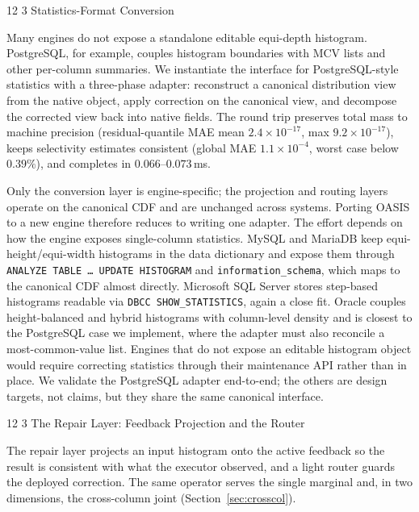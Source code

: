 \documentclass[preprint,12pt]{elsarticle}
\makeatletter
\renewcommand\subsection{\@startsection{subsection}{2}{\z@}%
           {12\p@ \@plus 6\p@ \@minus 3\p@}%
           {3\p@ \@plus 6\p@ \@minus 3\p@}%
           {\normalfont\normalsize\bfseries}}
\makeatother
\begin{document}
\subsection{Statistics-Format Conversion}
\label{sec:mcv-adapter}

Many engines do not expose a standalone editable equi-depth histogram. PostgreSQL,
for example, couples histogram boundaries with MCV lists and other per-column
summaries. We instantiate the interface for PostgreSQL-style statistics with a
three-phase adapter: reconstruct a canonical distribution view from the native
object, apply correction on the canonical view, and decompose the corrected view
back into native fields. The round trip preserves total mass to machine precision
(residual-quantile MAE mean $2.4\times10^{-17}$, max $9.2\times10^{-17}$), keeps
selectivity estimates consistent (global MAE $1.1\times10^{-4}$, worst case below
$0.39\%$), and completes in $0.066$--$0.073$\,ms.

Only the conversion layer is engine-specific; the projection and routing layers
operate on the canonical CDF and are unchanged across systems. Porting OASIS to a new
engine therefore reduces to writing one adapter. The effort depends on how the engine
exposes single-column statistics. MySQL and MariaDB keep equi-height/equi-width histograms
in the data dictionary and expose them through \texttt{ANALYZE TABLE \ldots\ UPDATE
HISTOGRAM} and \texttt{information\_schema}, which maps to the canonical CDF almost
directly. Microsoft SQL Server stores step-based histograms readable via
\texttt{DBCC SHOW\_STATISTICS}, again a close fit. Oracle couples height-balanced and
hybrid histograms with column-level density and is closest to the PostgreSQL case we
implement, where the adapter must also reconcile a most-common-value list. Engines that do
not expose an editable histogram object would require correcting statistics through their
maintenance API rather than in place. We validate the PostgreSQL adapter end-to-end; the
others are design targets, not claims, but they share the same canonical interface.

\subsection{The Repair Layer: Feedback Projection and the Router}
\label{sec:stage2}

The repair layer projects an input histogram onto the active feedback so
the result is consistent with what the executor observed, and a light router guards the
deployed correction. The same operator serves the single marginal and, in two dimensions, the
cross-column joint (Section~\ref{sec:crosscol}).
\end{document}
